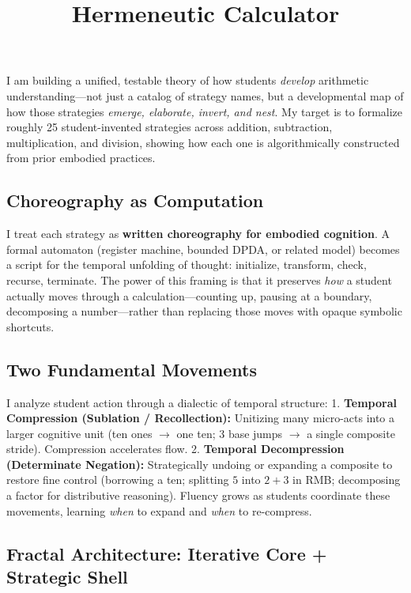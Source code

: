 \documentclass[
]{article}
\title{Hermeneutic Calculator}
\author{}
\date{}
\begin{document}
\maketitle

I am building a unified, testable theory of how students \emph{develop}
arithmetic understanding---not just a catalog of strategy names, but a
developmental map of how those strategies \emph{emerge, elaborate,
invert, and nest}. My target is to formalize roughly 25 student-invented
strategies across addition, subtraction, multiplication, and division,
showing how each one is algorithmically constructed from prior embodied
practices.

\subsection{Choreography as
Computation}\label{choreography-as-computation}

I treat each strategy as \textbf{written choreography for embodied
cognition}. A formal automaton (register machine, bounded DPDA, or
related model) becomes a script for the temporal unfolding of thought:
initialize, transform, check, recurse, terminate. The power of this
framing is that it preserves \emph{how} a student actually moves through
a calculation---counting up, pausing at a boundary, decomposing a
number---rather than replacing those moves with opaque symbolic
shortcuts.

\subsection{Two Fundamental Movements}\label{two-fundamental-movements}

I analyze student action through a dialectic of temporal structure: 1.
\textbf{Temporal Compression (Sublation / Recollection):} Unitizing many
micro-acts into a larger cognitive unit (ten ones \(\to\) one ten; 3
base jumps \(\to\) a single composite stride). Compression accelerates
flow. 2. \textbf{Temporal Decompression (Determinate Negation):}
Strategically undoing or expanding a composite to restore fine control
(borrowing a ten; splitting \(5\) into \(2+3\) in RMB; decomposing a
factor for distributive reasoning). Fluency grows as students coordinate
these movements, learning \emph{when} to expand and \emph{when} to
re-compress.

\subsection{Fractal Architecture: Iterative Core + Strategic
Shell}\label{fractal-architecture-iterative-core-strategic-shell}
\end{document}
